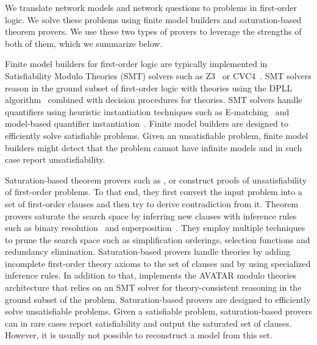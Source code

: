 We translate network models and network questions to problems in first-order logic. We solve these problems using finite model builders and saturation-based theorem provers. We use these two types of provers to leverage the strengths of both of them, which we summarize below.

Finite model builders for first-order logic are typically implemented in Satisfiability Modulo Theories (SMT) solvers such as Z3~\cite{Z3} or CVC4~\cite{CVC4}. SMT solvers reason in the ground subset of first-order logic with theories using the DPLL algorithm~\cite{davis1960computing} combined with decision procedures for theories. SMT solvers handle quantifiers using heuristic instantiation techniques such as E-matching~\cite{DBLP:journals/jacm/DetlefsNS05,DBLP:conf/cade/MouraB07} and model-based quantifier instantiation~\cite{DBLP:journals/jacm/DetlefsNS05,DBLP:conf/cade/MouraB07}. Finite model builders are designed to efficiently solve satisfiable problems. Given an unsatisfiable problem, finite model builders might detect that the problem cannot have infinite models and in such case report unsatisfiability.

Saturation-based theorem provers such as \eprover\cite{E13}, \spass\cite{Spass} or \vampire\cite{Vampire13} construct proofs of unsatisfiability of first-order problems. To that end, they first convert the input problem into a set of first-order clauses and then try to derive contradiction from it. Theorem provers saturate the search space by inferring new clauses with inference rules such as binary resolution~\cite{Ganzinger01} and superposition~\cite{NieuwenhuisRubio:HandbookAR:paramodulation:2001}. They employ multiple techniques to prune the search space such as simplification orderings, selection functions and redundancy elimination. Saturation-based provers handle theories by adding incomplete first-order theory axioms to the set of clauses and by using specialized inference rules. In addition to that, \vampire implements the AVATAR modulo theories~\cite{DBLP:conf/gcai/RegerB0V16} architecture that relies on an SMT solver for theory-consistent reasoning in the ground subset of the problem. Saturation-based provers are designed to efficiently solve unsatisfiable problems. Given a satisfiable problem, saturation-based provers can in rare cases report satisfiability and output the saturated set of clauses. However, it is usually not possible to reconstruct a model from this set.

